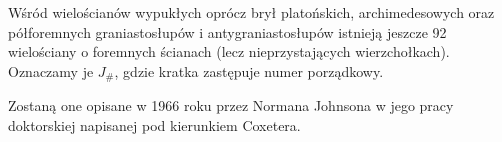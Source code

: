 %

Wśród wielościanów wypukłych oprócz brył platońskich, archimedesowych oraz półforemnych graniastosłupów i antygraniastosłupów istnieją jeszcze 92 wielościany o foremnych ścianach (lecz nieprzystających wierzchołkach).
Oznaczamy je $J_{\#}$, gdzie kratka zastępuje numer porządkowy.



Zostaną one opisane w 1966 roku przez Normana Johnsona w jego pracy doktorskiej napisanej pod kierunkiem Coxetera.


%
